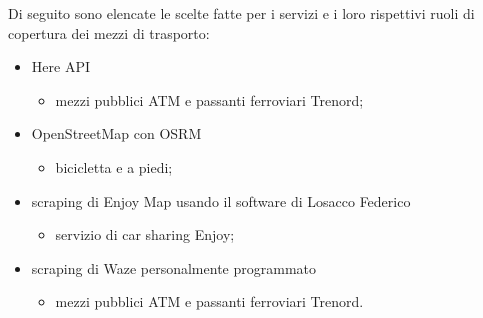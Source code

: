Di seguito sono elencate le scelte fatte per i servizi e i loro rispettivi ruoli di copertura dei mezzi di trasporto:

\begin{itemize}
	\item Here API
	\begin{itemize}
		\item mezzi pubblici ATM e passanti ferroviari Trenord;
	\end{itemize}

	\item OpenStreetMap con OSRM
	\begin{itemize}
		\item bicicletta e a piedi;
	\end{itemize}

	\item scraping di Enjoy Map usando il software di Losacco Federico \cite{trentini2017sampling}
	\begin{itemize}
		\item servizio di car sharing Enjoy;
	\end{itemize}

	\item scraping di Waze personalmente programmato
	\begin{itemize}
		\item mezzi pubblici ATM e passanti ferroviari Trenord.
	\end{itemize}
\end{itemize}
